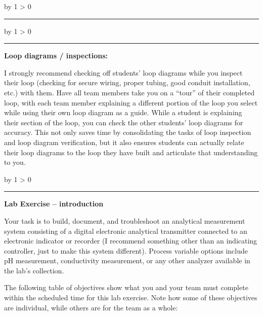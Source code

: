 \documentclass[12pt,a4paper]{article}
\def\oppgave{
            \advance\questnum by 1
            \ifnum \questnum > 0
                 \hrule
                 \vskip 3pt
                 \leftline{Oppgave \the\questnum}
                 \vskip 3pt \fi}
\def\svar{
           \advance\answnum by 1
           \ifnum \answnum > 0
                \hrule
                \vskip 3pt
                \leftline{Svar \the\answnum}
                \vskip 3pt \fi}
\def\notes{
           \advance\explnum by 1
           \ifnum \explnum > 0
                \hrule
                \vskip 3pt
                \leftline{Notes \the\explnum}
                \vskip 3pt \fi}
\begin{document}
\vskip 10pt \filbreak 





\svar{} 


\vskip 10pt \filbreak 





\notes{} 

\noindent
{\bf Loop diagrams / inspections:}

I strongly recommend checking off students' loop diagrams while you inspect their loop (checking for secure wiring, proper tubing, good conduit installation, etc.) with them.  Have all team members take you on a ``tour'' of their completed loop, with each team member explaining a different portion of the loop you select while using their own loop diagram as a guide.  While a student is explaining their section of the loop, you can check the other students' loop diagrams for accuracy.  This not only saves time by consolidating the tasks of loop inspection and loop diagram verification, but it also ensures students can actually relate their loop diagrams to the loop they have built and articulate that understanding to you.


\vfil \eject 



\oppgave{} 

\noindent

\vskip 5pt

{\bf Lab Exercise -- introduction}

\vskip 5pt

Your task is to build, document, and troubleshoot an analytical measurement system consisting of a digital electronic analytical transmitter connected to an electronic indicator or recorder (I recommend something other than an indicating controller, just to make this system different).  Process variable options include pH measurement, conductivity measurement, or any other analyzer available in the lab's collection.  

The following table of objectives show what you and your team must complete within the scheduled time for this lab exercise.  Note how some of these objectives are individual, while others are for the team as a whole:
\end{document}
